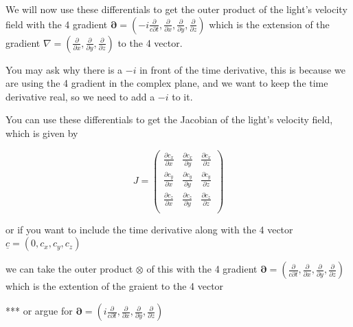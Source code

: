 We will now use these differentials to get the outer product of the light's velocity field with the 4 gradient $\boldsymbol{\partial} = \left( -i\frac{\partial}{c \partial t}, \frac{\partial}{\partial x}, \frac{\partial}{\partial y}, \frac{\partial}{\partial z} \right)$ which is the extension of the gradient $\nabla=\left( \frac{\partial}{\partial x}, \frac{\partial}{\partial y}, \frac{\partial}{\partial z} \right)$ to the 4 vector.



You may ask why there is a $-i$ in front of the time derivative, this is because we are using the 4 gradient in the complex plane, and we want to keep the time derivative real, so we need to add a $-i$ to it.

You can use these differentials to get the Jacobian of the light's velocity field, which is given by

\begin{equation}
	J =
	\begin{pmatrix}
		\frac{\partial c_x}{\partial x} & \frac{\partial c_x}{\partial y} & \frac{\partial c_x}{\partial z} \\
		\frac{\partial c_y}{\partial x} & \frac{\partial c_y}{\partial y} & \frac{\partial c_y}{\partial z} \\
		\frac{\partial c_z}{\partial x} & \frac{\partial c_z}{\partial y} & \frac{\partial c_z}{\partial z} \\
	\end{pmatrix}
\end{equation}

or if you want to include the time derivative along with the 4 vector $\underline{c}= (0,c_x,c_y,c_z)$

we can take the outer product $\otimes$ of this with the 4 gradient $\boldsymbol{\partial} = \left( \frac{\partial}{c \partial t}, \frac{\partial}{\partial x}, \frac{\partial}{\partial y}, \frac{\partial}{\partial z} \right)$ which is the extention of the graient to the 4 vector

*** or argue for $\boldsymbol{\partial} = \left( i \frac{\partial}{c \partial t}, \frac{\partial}{\partial x}, \frac{\partial}{\partial y}, \frac{\partial}{\partial z} \right)$

